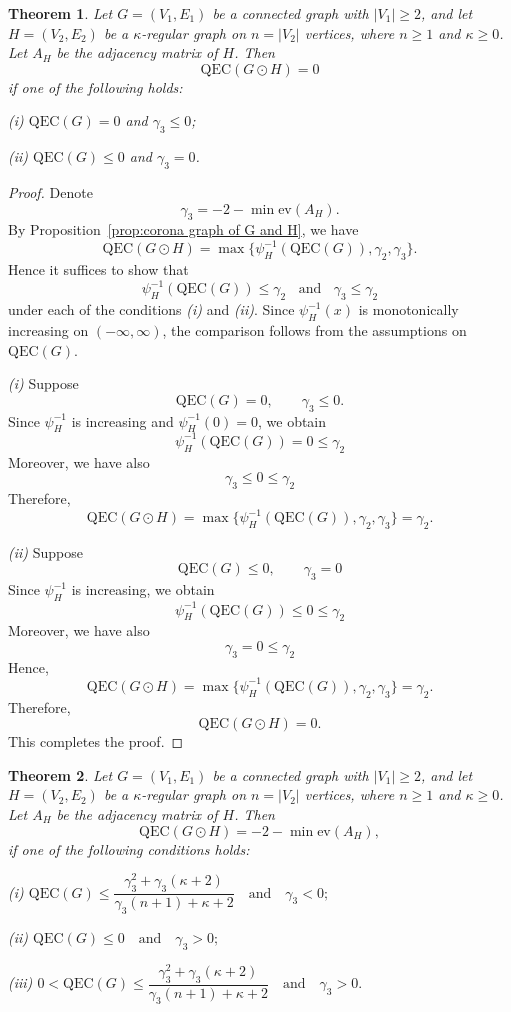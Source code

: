 \documentclass[pdflatex,sn-mathphys-num]{sn-jnl}
\theoremstyle{thmstyleone}%
\newtheorem{theorem}{Theorem}%
\theoremstyle{thmstyletwo}%
\theoremstyle{thmstylethree}%
\begin{document}
\begin{theorem}\label{theorem corona graph with lambda equal zero}
Let $G=(V_1,E_1)$ be a connected graph with $|V_1|\ge 2$, and let 
$H=(V_2,E_2)$ be a $\kappa$-regular graph on $n=|V_2|$ vertices, where $n\ge 1$ and $\kappa\ge 0$. 
Let $A_H$ be the adjacency matrix of $H$. Then
\[
\mathrm{QEC}(G \odot H) = 0
\]
if one of the following holds:

\medskip
\noindent
\textit{(i)} $\mathrm{QEC}(G) = 0$ and $\gamma_3\le 0$;

\medskip
\noindent
\textit{(ii)} $\mathrm{QEC}(G) \le 0$ and $\gamma_3= 0$.
\end{theorem}

\begin{proof}
Denote
\[
\gamma_3 = -2 - \min \mathrm{ev}(A_H).
\]
By Proposition~\ref{prop:corona graph of G and H}, we have
\[
\mathrm{QEC}(G \odot H)
=
\max\{\psi_{H}^{-1}(\mathrm{QEC}(G)),\gamma_2,\gamma_3\}.
\]
Hence it suffices to show that
\[
\psi_{H}^{-1}(\mathrm{QEC}(G)) \le \gamma_2\;\; \text{ and }\;\; \gamma_3 \le \gamma_2
\]
under each of the conditions \textit{(i)} and \textit{(ii)}. Since $\psi_{H}^{-1}(x)$ is monotonically increasing on $(-\infty,\infty)$, the comparison follows from the assumptions on $\mathrm{QEC}(G)$.

\medskip
\noindent
\textit{(i)} Suppose
\[
\mathrm{QEC}(G) = 0, \qquad \gamma_3\le 0.
\]
Since $\psi^{-1}_H$ is increasing and $\psi^{-1}_H(0)=0$, we obtain
\[\psi_{H}^{-1}(\mathrm{QEC}(G))=0 \le \gamma_2\]
Moreover, we have also
\[\gamma_3\le 0\le \gamma_2\]
Therefore,
\[
\mathrm{QEC}(G \odot H)
=
\max\{\psi_H^{-1}(\mathrm{QEC}(G)), \gamma_2,\gamma_3\}
=
\gamma_2.
\]

\medskip
\noindent
\textit{(ii)} Suppose
\[
\mathrm{QEC}(G) \le 0, \qquad \gamma_3= 0
\]
Since $\psi^{-1}_H$ is increasing, we obtain
\[\psi_{H}^{-1}(\mathrm{QEC}(G))\le0 \le \gamma_2\]
Moreover, we have also
\[\gamma_3=0\le \gamma_2\]
Hence,
\[
\mathrm{QEC}(G \odot H)
=
\max\{\psi_H^{-1}(\mathrm{QEC}(G)), \gamma_2,\gamma_3\}
=
\gamma_2.
\]
Therefore,
\[
\mathrm{QEC}(G \odot H)=0.
\]
This completes the proof.
\end{proof}

\begin{theorem}
\label{theo III : QEC of corona graph G and H - min eigenvalue case}
Let $G=(V_1,E_1)$ be a connected graph with $|V_1|\ge 2$, and let 
$H=(V_2,E_2)$ be a $\kappa$-regular graph on $n=|V_2|$ vertices, where $n\ge 1$ and $\kappa\ge 0$. Let $A_H$ be the adjacency matrix of $H$. Then
\[
\mathrm{QEC}(G \odot H) = -2 - \min \mathrm{ev}(A_H),
\]
if one of the following conditions holds:

\medskip\noindent
\textit{(i)} 
$\mathrm{QEC}(G) \le
\dfrac{\gamma_3^2 + \gamma_3(\kappa+2)}
{\gamma_3(n+1) + \kappa+2}
\quad \text{and} \quad
\gamma_3 < 0;$

\medskip\noindent
\textit{(ii)} 
$\mathrm{QEC}(G) \le 0
\quad \text{and} \quad
\gamma_3 > 0;$

\medskip\noindent
\textit{(iii)}
$0 < \mathrm{QEC}(G) \le
\dfrac{\gamma_3^2 + \gamma_3(\kappa+2)}
{\gamma_3(n+1) + \kappa+2}
\quad \text{and} \quad
\gamma_3 > 0.$
\end{theorem}
\end{document}
